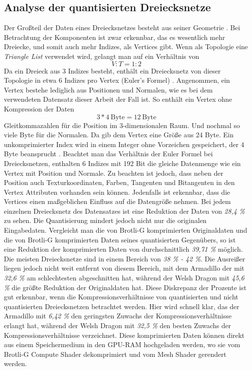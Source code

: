 \subsection{Analyse der quantisierten Dreiecksnetze}
\label{subsec:ana_quantized}
Der Großteil der Daten eines Dreiecksnetzes besteht aus seiner Geometrie \cite{Jakob2017}.
Bei Betrachtung der Komponenten ist zwar erkennbar, das es wesentlich mehr Dreiecke, und somit auch mehr Indizes, als Vertices gibt.
Wenn als Topologie eine \textit{Triangle List} verwendet wird, gelangt man auf ein Verhältnis von 
\begin{equation*}
V:T = 1:2
\end{equation*}
Da ein Dreieck aus 3 Indizes besteht, enthält ein Dreiecksnetz von dieser Topologie in etwa 6 Indizes pro Vertex (Euler's Formel) \cite{Engstad2011}.
Angenommen, ein Vertex bestehe lediglich aus Positionen und Normalen, wie es bei dem verwendeten Datensatz dieser Arbeit der Fall ist.
So enthält ein Vertex ohne Kompression der Daten
\begin{equation*}
3 * 4 \ \text{Byte} = 12 \ \text{Byte}
\end{equation*}
Gleitkommazahlen für die Position im 3-dimensionalen Raum.
Und nochmal so viele Byte für die Normalen.
Da gib dem Vertex eine Größe aus 24 Byte.
Ein unkomprimierter Index wird in einem Integer ohne Vorzeichen gespeichert, der 4 Byte beansprucht \cite{Microsoft2021a}. \newline
Beachtet man das Verhältnis der Euler Formel bei Dreiecksnetzen, enthalten 6 Indizes mit 192 Bit die gleiche Datenmenge wie ein Vertex mit Position und Normale.
Zu beachten ist jedoch, dass neben der Position auch Texturkoordinaten, Farben, Tangenten und Bitangenten in den Vertex Attributen vorhanden sein können. \newline
Jedenfalls ist erkennbar, dass die Vertices einen maßgeblichen Einfluss auf die Datengröße nehmen.
Bei jedem einzelnen Dreiecksnetz des Datensatzes ist eine Reduktion der Daten von \textit{28,4 \%} zu sehen.
Die Quantisierung mindert jedoch nicht nur die originalen Eingabedaten.
Vergleicht man die von Brotli-G komprimierten Originaldaten und die von Brotli-G komprimierten Daten seines quantisierten Gegenübers, so ist eine Reduktion der komprimierten Daten von durchschnittlich \textit{39,71 \%} möglich.
Die meisten Dreiecksnetze sind in einem Bereich von \textit{38 \% - 42 \%}.
Die Ausreißer liegen jedoch nicht weit entfernt von diesem Bereich, mit dem Armadillo der mit \textit{32,6 \%} am schlechtesten abgeschnitten hat, während der Welsh Dragon mit \textit{45,6 \%} die größte Reduktion der Originaldaten hat.
Diese Diskrepanz der Prozente ist gut erkennbar, wenn die Kompressionsverhältnisse von quantisierten und nicht quantisierten Dreiecksnetzen betrachtet werden.
Hier wird schnell klar, das der Armadillo mit \textit{6,42 \%} den geringsten Zuwachs der Kompressionsverhältnisse erlangt hat, während der Welsh Dragon mit \textit{32,5 \%} den besten Zuwachs der Kompressionsverhältnisse verzeichnet.
Diese komprimierten Daten können direkt aus einem Speichermedium in den GPU-RAM hochgeladen werden, wo sie vom Brotli-G Compute Shader dekomprimiert und vom Mesh Shader gerendert werden. \newline

